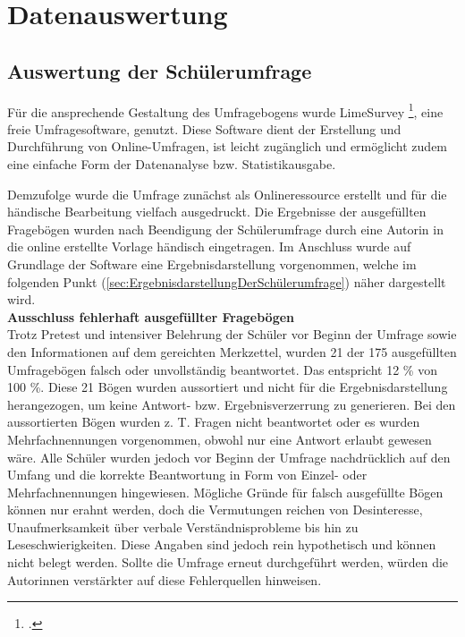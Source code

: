 \section{Datenauswertung}
\label{sec:Datenauswertung}

\subsection{Auswertung der Schülerumfrage}
\label{sec:AuswertungDerSchülerumfrage}

Für die ansprechende Gestaltung des Umfragebogens wurde LimeSurvey \footcite {LimeSurvey2015}, eine freie Umfragesoftware, genutzt. Diese Software dient der Erstellung und Durchführung von Online-Umfragen, ist leicht zugänglich und ermöglicht zudem eine einfache Form der Datenanalyse bzw. Statistikausgabe.

Demzufolge wurde die Umfrage zunächst als Onlineressource erstellt und für die händische Bearbeitung vielfach ausgedruckt. Die Ergebnisse der ausgefüllten Fragebögen wurden nach Beendigung der Schülerumfrage durch eine Autorin in die online erstellte Vorlage händisch eingetragen. Im Anschluss wurde auf Grundlage der Software eine Ergebnisdarstellung vorgenommen, welche im folgenden Punkt (\ref{sec:ErgebnisdarstellungDerSchülerumfrage}) näher dargestellt wird.\\

\noindent
\textbf{Ausschluss fehlerhaft ausgefüllter Fragebögen}\\

\noindent
Trotz Pretest und intensiver Belehrung der Schüler vor Beginn der Umfrage sowie den Informationen auf dem gereichten Merkzettel, wurden 21 der 175 ausgefüllten Umfragebögen falsch oder unvollständig beantwortet. Das entspricht 12 \% von 100 \%. Diese 21 Bögen wurden aussortiert und nicht für die Ergebnisdarstellung herangezogen, um keine Antwort- bzw. Ergebnisverzerrung zu generieren. Bei den aussortierten Bögen wurden z. T. Fragen nicht beantwortet oder es wurden Mehrfachnennungen vorgenommen, obwohl nur eine Antwort erlaubt gewesen wäre. Alle Schüler wurden jedoch vor Beginn der Umfrage nachdrücklich auf den Umfang und die korrekte Beantwortung in Form von Einzel- oder Mehrfachnennungen hingewiesen. Mögliche Gründe für falsch ausgefüllte Bögen können nur erahnt werden, doch die Vermutungen reichen von Desinteresse, Unaufmerksamkeit über verbale Verständnisprobleme bis hin zu Leseschwierigkeiten. Diese Angaben sind jedoch rein hypothetisch und können nicht belegt werden. Sollte die Umfrage erneut durchgeführt werden, würden die Autorinnen verstärkter auf diese Fehlerquellen hinweisen. 

